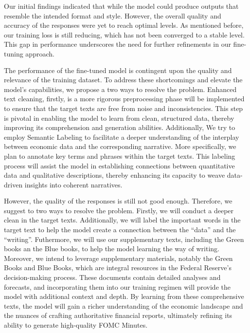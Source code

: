 Our initial findings indicated that while the model could produce outputs that resemble the intended format and style. However, the overall quality and accuracy of the responses were yet to reach optimal levels. As mentioned before, our training loss is still reducing, which has not been converged to a stable level. This gap in performance underscores the need for further refinements in our fine-tuning approach.



The performance of the fine-tuned model is contingent upon the quality and relevance of the training dataset. To address these shortcomings and elevate the model's capabilities, we propose a two ways to resolve the problem. Enhanced text cleaning, firstly, is a more rigorous preprocessing phase will be implemented to ensure that the target texts are free from noise and inconsistencies. This step is pivotal in enabling the model to learn from clean, structured data, thereby improving its comprehension and generation abilities. Additionally, We try to employ Semantic Labeling to facilitate a deeper understanding of the interplay between economic data and the corresponding narrative. More specifically, we plan to annotate key terms and phrases within the target texts. This labeling process will assist the model in establishing connections between quantitative data and qualitative descriptions, thereby enhancing its capacity to weave data-driven insights into coherent narratives.

However,  the quality of the responses is still not good enough. Therefore, we suggest to two ways to resolve the problem. Firstly, we will conduct a deeper clean in the target texts. Additionally, we will label the important words in the target text to help the model create a connection between the ``data'' and the ``writing''. Futhermore, we will use our supplementary texts, including the Green books an the Blue books, to help the model learning the way of writing. Moreover, we intend to leverage supplementary materials, notably the Green Books and Blue Books, which are integral resources in the Federal Reserve's decision-making process. These documents contain detailed analyses and forecasts, and incorporating them into our training regimen will provide the model with additional context and depth. By learning from these comprehensive texts, the model will gain a richer understanding of the economic landscape and the nuances of crafting authoritative financial reports, ultimately refining its ability to generate high-quality FOMC Minutes.


